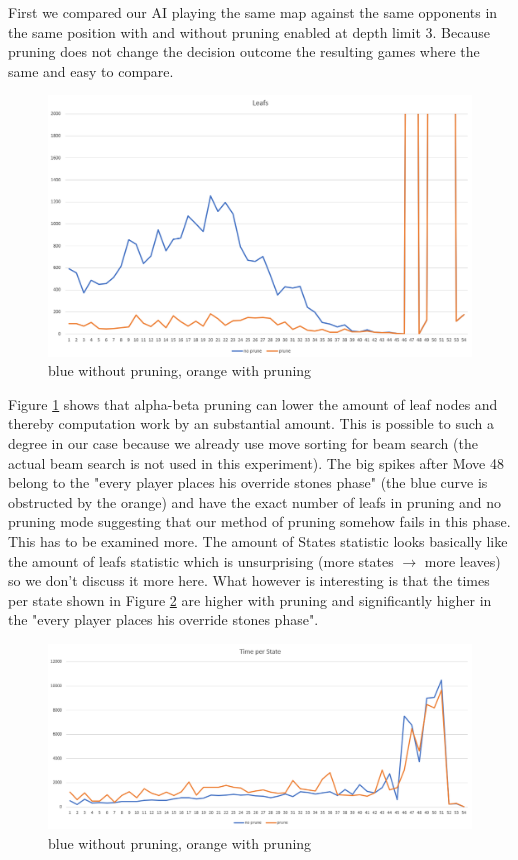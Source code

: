 \documentclass[a4paper,12pt]{article}
\begin{document}
First we compared our AI playing the same map against the same opponents in the same position with and without pruning enabled at depth limit 3. Because pruning does not change the decision outcome the resulting games where the same and easy to compare. 
\begin{figure}[h!]
    \centering
    \includegraphics[width = 14cm]{leafs.png}
    \caption{blue without pruning, orange with pruning}
    \label{fig:leafs}
\end{figure}
Figure \ref{fig:leafs} shows that alpha-beta pruning can lower the amount of leaf nodes and thereby computation work by an substantial amount. This is possible to such a degree in our case because we already use move sorting for beam search (the actual beam search is not used in this experiment). The big spikes after Move 48 belong to the "every player places his override stones phase" (the blue curve is obstructed by the orange) and have the exact number of leafs in pruning and no pruning mode suggesting that our method of pruning somehow fails in this phase. This has to be examined more. The amount of States statistic looks basically like the amount of leafs statistic which is unsurprising (more states $\to$ more leaves) so we don't discuss it more here. What however is interesting is that the times per state shown in Figure \ref{fig:tps} are higher with pruning and significantly higher in the "every player places his override stones phase".
\begin{figure}[h!]
    \centering
    \includegraphics[width = 14cm]{tps.png}
    \caption{blue without pruning, orange with pruning}
    \label{fig:tps}
\end{figure}
\end{document}
